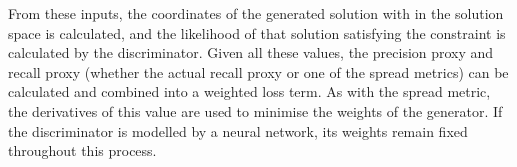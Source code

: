 \documentclass[../../main.tex]{subfiles}
\begin{document}
From these inputs, the coordinates of the generated solution with in the solution space is calculated, and the likelihood of that solution satisfying the constraint is calculated by the discriminator.
Given all these values, the precision proxy and recall proxy (whether the actual recall proxy or one of the spread metrics) can be calculated and combined into a weighted loss term.
As with the spread metric, the derivatives of this value are used to minimise the weights of the generator.
If the discriminator is modelled by a neural network, its weights remain fixed throughout this process.
\end{document}
